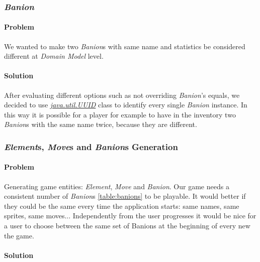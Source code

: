 \documentclass[12pt, a4paper]{report}
\begin{document}
        \subsubsection{\emph{Banion}}

            \paragraph{Problem}

            We wanted to make two \emph{Banion}s with same name and statistics be considered different at \emph{Domain Model} level.

            \paragraph{Solution}

            After evaluating different options such as not overriding \emph{Banion}'s equals, we decided to use
            \href{https://docs.oracle.com/en/java/javase/17/docs/api/java.base/java/util/UUID.html}{\textit{java.util.UUID}} class to identify every single \emph{Banion} instance.
            In this way it is possible for a player for example to have in the inventory two \emph{Banion}s with the same name twice, because they are different.

        \subsubsection{\emph{Element}s, \emph{Move}s and \emph{Banion}s Generation}

            \paragraph{Problem}
            
            Generating game entities: \emph{Element}, \emph{Move} and \emph{Banion}. Our game needs a consistent number of \emph{Banion}s \ref{table:banions} to be playable.
            It would better if they could be the same every time the application starts: same names, same sprites, same moves...
            Independently from the user progresses it would be nice for a user to choose between the same set of Banions at the beginning of every new the game.

            \paragraph{Solution}
\end{document}
